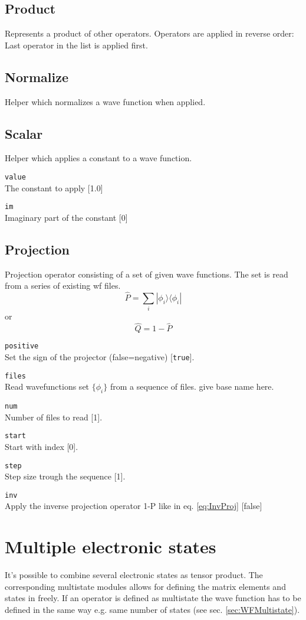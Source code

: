 \documentclass[a4paper,12pt]{scrbook}
\newcommand{\option}[2]{\item \texttt{#1}\\ #2}
\newcommand{\code}[1]{\texttt{#1}}
\begin{document}
\subsection{Product}
Represents a product of other operators.
Operators are applied in reverse order: Last operator in the list is applied first.

\subsection{Normalize}
Helper which normalizes a wave function when applied.

\subsection{Scalar}
Helper which applies a constant to a wave function.
\begin{options}
 \option{value}{The constant to apply [1.0]}
 \option{im}{Imaginary part of the constant [0]}
\end{options}

\subsection{Projection}
Projection operator consisting of a set of given wave functions. The set is read from
a series of existing wf files.
\begin{equation}
 \hat P = \sum_i |\phi_i\rangle \langle \phi_i|
\end{equation}
or
\begin{equation}
 \label{eq:InvProj}
 \hat Q = 1 - \hat P
\end{equation}
\begin{options}
\option{positive}{Set the sign of the projector (false=negative) [\code{true}].}
\option{files}{Read wavefunctions set $\{\phi_i\}$ from a sequence of files. give base name here.}
\option{num}{Number of files to read [1].}
\option{start}{Start with index [0].}
\option{step}{Step size trough the sequence [1].}
\option{inv}{Apply the inverse projection operator 1-P like in eq. \ref{eq:InvProj} [false]}
\end{options}

\section{Multiple electronic states}
It's possible to combine several electronic states as tensor product. The corresponding multistate
modules allows for defining the matrix elements and states in freely.
If an operator is defined as multistate the wave function has to be defined in the same way e.g. same
number of states (see sec. \ref{sec:WFMultistate}).
\end{document}
